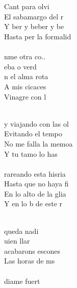 \begin{cancion}[Sixtinain][Guitarricadelafuente]%
\jump\\
	     \chord{(}{**)}{    }\\
	Cant para olvi\\
	El sabamargo del r\\
	Y ber y beber y be\\
	Hasta per la formalid\\
\jump\\
	nme otra co..\\
	eba o verd\\
	n el alma rota\\
	A mis cicaces\\
	Vinagre con l \\\jump\\
	\begin{chorus}%
	y viajando con las ol\\
	Evitando el tempo\\
	No me falla la memoa\\
	Y tu tamo lo has \\
\jump\\
	rareando esta hisria\\
	Hasta que no haya fi\\
	En lo alto de la glia\\
	Y en lo b de este r \\
	\end{chorus}%
	\jump\\
	 queda nadi\\
	uien llar\\
	 acabarons escones\\
	Las horas de ms\\
\jump\\
	diame fuert\\

\end{cancion}
